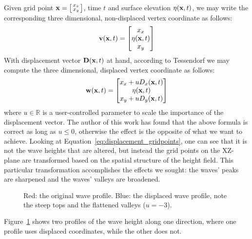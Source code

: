 Given grid point $\mathbf{x} = \left[ \begin{smallmatrix} x_x \\ x_y 
\end{smallmatrix}\right]$, time $t$ and surface elevation $\eta(\mathbf{x},t)$, 
we may write the corresponding three dimensional, non-displaced vertex 
coordinate as follows:
\begin{equation}
 \mathbf{v}(\mathbf{x},t) = \begin{bmatrix}x_x\\ \eta(\mathbf{x},t)\\ x_y 
\end{bmatrix} 
\end{equation}
With displacement vector $\mathbf{D}(\mathbf{x},t)$ at hand, according to 
Tessendorf we may compute the three dimensional, displaced vertex coordinate as 
follows:
\begin{equation}
\label{eq:displacement_gridpoints}
 \mathbf{w}(\mathbf{x},t) =
 \begin{bmatrix}
  x_x + u D_x(\mathbf{x},t)\\ 
  \eta(\mathbf{x},t)\\
  x_y + u D_y(\mathbf{x},t)
 \end{bmatrix}
\end{equation}
where $u\in\mathbb{R}$ is a user-controlled parameter to scale the importance of the
displacement vector. The author of this work has found that the above formula
is correct as long as $u \leq 0$, otherwise the effect is the opposite of 
what we want to achieve. Looking at Equation~\ref{eq:displacement_gridpoints},
one can see that it is not the wave heights that are altered, but instead the grid
points on the XZ-plane are transformed based on the spatial structure of the
height field. This particular transformation accomplishes the effects we sought:
the waves' peaks are sharpened and the waves' valleys are broadened.
%
\begin{figure}
\centering
{}
\caption{Red: the original wave profile. Blue: the displaced wave profile, note 
the steep tops and the flattened valleys ($u = -3$).}
\label{fig:grid_displaced}
\end{figure}
%
Figure~\ref{fig:grid_displaced} shows two profiles of the wave height along one 
direction, where one profile uses displaced coordinates, while the other does 
not.
%
